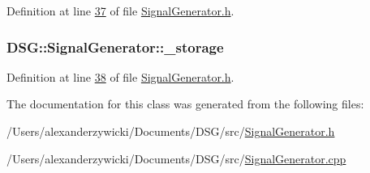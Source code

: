 Definition at line \hyperlink{_signal_generator_8h_source_l00037}{37} of file \hyperlink{_signal_generator_8h_source}{Signal\+Generator.\+h}.

\hypertarget{class_d_s_g_1_1_signal_generator_a28a9b47a1aa0783029f11a19ba0363f2}{
\subsubsection[{\+\_\+storage}]{ D\+S\+G\+::\+Signal\+Generator\+::\+\_\+storage\hspace{0.3cm}{\ttfamily [protected]}}}\label{class_d_s_g_1_1_signal_generator_a28a9b47a1aa0783029f11a19ba0363f2}


Definition at line \hyperlink{_signal_generator_8h_source_l00038}{38} of file \hyperlink{_signal_generator_8h_source}{Signal\+Generator.\+h}.



The documentation for this class was generated from the following files\+:\begin{DoxyCompactItemize}
\item 
/\+Users/alexanderzywicki/\+Documents/\+D\+S\+G/src/\hyperlink{_signal_generator_8h}{Signal\+Generator.\+h}\item 
/\+Users/alexanderzywicki/\+Documents/\+D\+S\+G/src/\hyperlink{_signal_generator_8cpp}{Signal\+Generator.\+cpp}\end{DoxyCompactItemize}
